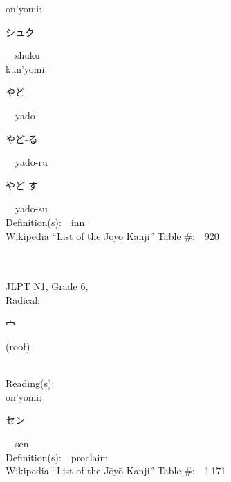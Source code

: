 \begin{multicols}{2}
{\hspace*{1em}}on'yomi:\ \ \\
{\hspace*{2em}}{\begin{CJK}{UTF8}{min} シュク \end{CJK}}\ \ shuku\ \ \\
{\hspace*{1em}}kun'yomi:\ \ \\
{\hspace*{2em}}{\begin{CJK}{UTF8}{min} やど \end{CJK}}\ \ yado\ \ \\
{\hspace*{2em}}{\begin{CJK}{UTF8}{min} やど-る \end{CJK}}\ \ yado-ru\ \ \\
{\hspace*{2em}}{\begin{CJK}{UTF8}{min} やど-す \end{CJK}}\ \ yado-su\ \ \\
Definition(s):\ \ inn \\
Wikipedia ``List of the J\=oy\=o Kanji'' Table \#:\ \ 920 \\
\ \ \\
{\fontsize{34pt}{40pt}  }\ \ \\  %
{JLPT N1, Grade 6, \\Radical:\ \ {\begin{CJK}{UTF8}{min} 宀 \end{CJK}} (roof) } \\
Reading(s):\ \ \\
{\hspace*{1em}}on'yomi:\ \ \\
{\hspace*{2em}}{\begin{CJK}{UTF8}{min} セン \end{CJK}}\ \ sen\ \ \\
Definition(s):\ \ proclaim \\
Wikipedia ``List of the J\=oy\=o Kanji'' Table \#:\ \ 1\,171 \\
\ \ \\
{\fontsize{34pt}{40pt}  }\ \ \\  %

\end{multicols}
